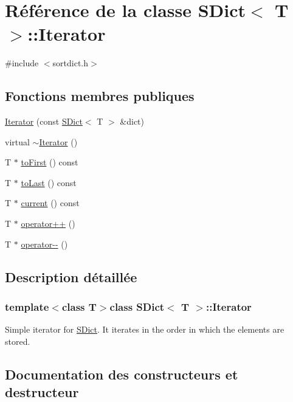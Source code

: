 \hypertarget{class_s_dict_1_1_iterator}{}\section{Référence de la classe S\+Dict$<$ T $>$\+:\+:Iterator}
\label{class_s_dict_1_1_iterator}


{\ttfamily \#include $<$sortdict.\+h$>$}

\subsection*{Fonctions membres publiques}
\begin{DoxyCompactItemize}
\item 
\hyperlink{class_s_dict_1_1_iterator_a0c8bd359d5c6e57123216f52130b95bc}{Iterator} (const \hyperlink{class_s_dict}{S\+Dict}$<$ T $>$ \&dict)
\item 
virtual \hyperlink{class_s_dict_1_1_iterator_a2b2dc67f8c7bf160bba90c79083edcd2}{$\sim$\+Iterator} ()
\item 
T $\ast$ \hyperlink{class_s_dict_1_1_iterator_a89f954f53860fef0f7495c292f663150}{to\+First} () const 
\item 
T $\ast$ \hyperlink{class_s_dict_1_1_iterator_a70b2fd3b028bc71c0f39ff8d89fa34ea}{to\+Last} () const 
\item 
T $\ast$ \hyperlink{class_s_dict_1_1_iterator_a7cb5c4e3c6cc381a4568bf8b2e93af15}{current} () const 
\item 
T $\ast$ \hyperlink{class_s_dict_1_1_iterator_ab3172aa53d339348bab5208611044908}{operator++} ()
\item 
T $\ast$ \hyperlink{class_s_dict_1_1_iterator_ab660d0dacf804b314112c5ac9ea41714}{operator-\/-\/} ()
\end{DoxyCompactItemize}


\subsection{Description détaillée}
\subsubsection*{template$<$class T$>$class S\+Dict$<$ T $>$\+::\+Iterator}

Simple iterator for \hyperlink{class_s_dict}{S\+Dict}. It iterates in the order in which the elements are stored. 

\subsection{Documentation des constructeurs et destructeur}
\hypertarget{class_s_dict_1_1_iterator_a0c8bd359d5c6e57123216f52130b95bc}{}
